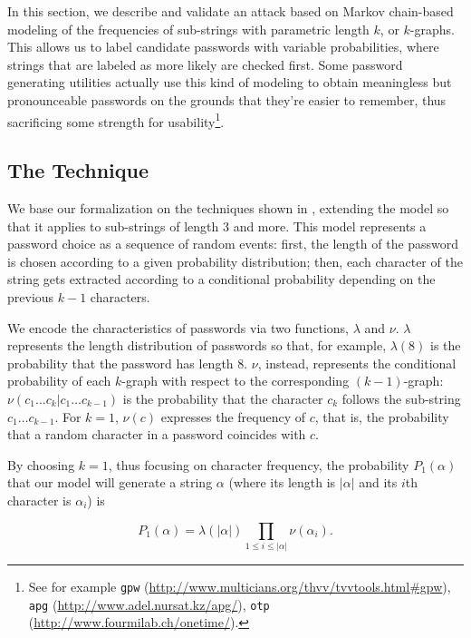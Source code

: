 \documentclass[a4paper,twocolumn]{article}
\begin{document}
In this section, we describe and validate an attack based on Markov
chain-based modeling of the frequencies of sub-strings with parametric
length $k$, or $k$-graphs. This allows us to label candidate passwords
with variable probabilities, where strings that are labeled as more
likely are checked first. Some password generating utilities actually
use this kind of modeling to obtain meaningless but pronounceable
passwords on the grounds that they're easier to remember, thus sacrificing
some strength for usability\footnote{See for example \texttt{gpw} (\url{http://www.multicians.org/thvv/tvvtools.html#gpw}),
\texttt{apg} (\url{http://www.adel.nursat.kz/apg/}), \texttt{otp}
(\url{http://www.fourmilab.ch/onetime/}).}.


\subsection{The Technique}

We base our formalization on the techniques shown in \cite{Narayanan2005Fast},
extending the model so that it applies to sub-strings of length 3
and more. This model represents a password choice as a sequence of
random events: first, the length of the password is chosen according
to a given probability distribution; then, each character of the string
gets extracted according to a conditional probability depending on
the previous $k-1$ characters.

We encode the characteristics of passwords via two functions, $\lambda$
and $\nu$. $\lambda$ represents the length distribution of passwords
so that, for example, $\lambda\left(8\right)$ is the probability
that the password has length 8. $\nu$, instead, represents the conditional
probability of each $k$-graph with respect to the corresponding $\left(k-1\right)$-graph:
$\nu\left(c_{1}\ldots c_{k}\left|c_{1}\ldots c_{k-1}\right.\right)$
is the probability that the character $c_{k}$ follows the sub-string
$c_{1}\ldots c_{k-1}$. For $k=1$, $\nu\left(c\right)$ expresses
the frequency of $c$, that is, the probability that a random character
in a password coincides with $c$.

By choosing $k=1$, thus focusing on character frequency, the probability
$P_{1}\left(\alpha\right)$ that our model will generate a string
$\alpha$ (where its length is $\left|\alpha\right|$ and its $i$th
character is $\alpha_{i}$) is

\[
P_{1}\left(\alpha\right)=\lambda\left(\left|\alpha\right|\right)\prod_{1\leq i\leq\left|\alpha\right|}\nu\left(\alpha_{i}\right).\]
\end{document}
